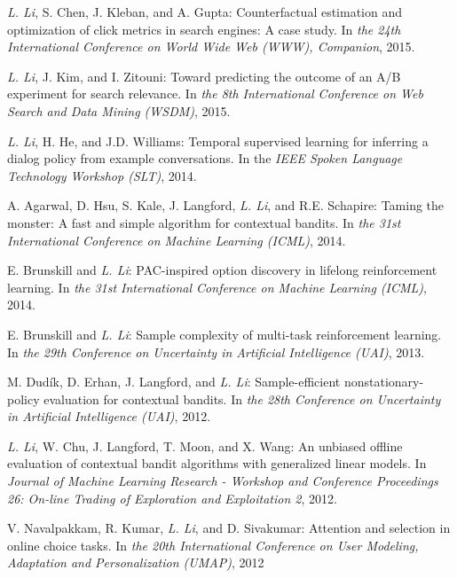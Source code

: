 \documentclass[10pt,twoside,letterpaper]{article}
\newcommand{\selffont}[1]{{\textit{#1}}}
\newcommand{\venuefont}[1]{{\textit{#1}}}
\newcommand{\myself}{\selffont{L. Li}}
\begin{document}
\begin{compactenum}[(C1)]
\item{\myself, S. Chen, J. Kleban, and A. Gupta: Counterfactual estimation and optimization of click metrics in search engines: A case study.  In \venuefont{the 24th International Conference on World Wide Web (WWW), Companion}, 2015.}

\item{\myself, J. Kim, and I. Zitouni: Toward predicting the outcome of an {A/B} experiment for search relevance.  In \venuefont{the 8th International Conference on Web Search and Data Mining (WSDM)}, 2015.}

\item{\myself, H. He, and J.D. Williams: Temporal supervised learning for inferring a dialog policy from example conversations.  In the \venuefont{IEEE Spoken Language Technology Workshop (SLT)}, 2014.}

\item{A. Agarwal, D. Hsu, S. Kale, J. Langford, \myself, and R.E. Schapire: Taming the monster: A fast and simple algorithm for contextual bandits.  In \venuefont{the 31st International Conference on Machine Learning (ICML)}, 2014.}

\item{E. Brunskill and \myself: PAC-inspired option discovery in lifelong reinforcement learning.  In \venuefont{the 31st International Conference on Machine Learning (ICML)}, 2014.}

\item{E. Brunskill and \myself: Sample complexity of multi-task reinforcement learning.  In \venuefont{the 29th Conference on Uncertainty in Artificial Intelligence (UAI)}, 2013.}

\item{M. Dud\'ik, D. Erhan, J. Langford, and \myself: Sample-efficient nonstationary-policy evaluation for contextual bandits.  In \venuefont{the 28th Conference on Uncertainty in Artificial Intelligence (UAI)}, 2012.}

\item{\myself, W. Chu, J. Langford, T. Moon, and X. Wang: An unbiased offline evaluation of contextual bandit algorithms with generalized linear models.  In \venuefont{Journal of Machine Learning Research - Workshop and Conference Proceedings 26: On-line Trading of Exploration and Exploitation 2}, 2012.}

\item{V. Navalpakkam, R. Kumar, \myself, and D. Sivakumar: Attention and selection in online choice tasks.  In \venuefont{the 20th International Conference on User Modeling, Adaptation and Personalization (UMAP)}, 2012}


\end{compactenum}
\end{document}
